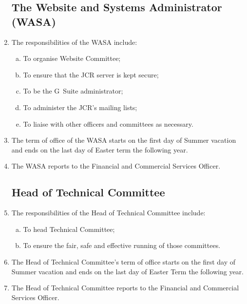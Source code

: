 \documentclass[12pt]{article}
\begin{document}
\begin{enumerate}
    \subsection{The Website and Systems Administrator (WASA)}
    \item The responsibilities of the WASA include:
    \begin{enumerate}[(a)]
        \item To organise Website Committee;
        \item To ensure that the JCR server is kept secure;
        \item To be the G~Suite administrator;
        \item To administer the JCR's mailing lists;
        \item To liaise with other officers and committees as necessary.
    \end{enumerate}
    \item The term of office of the WASA starts on the first day of Summer vacation and ends on the last day of Easter term the following year.
    \item The WASA reports to the Financial and Commercial Services Officer.

    \subsection{Head of Technical Committee}
    \item The responsibilities of the Head of Technical Committee include:
    \begin{enumerate}[(a)]
        \item To head Technical Committee;
        \item To ensure the fair, safe and effective running of those committees.
    \end{enumerate}
    \item The Head of Technical Committee's term of office starts on the first day of Summer vacation and ends on the last day of Easter Term the following year.
    \item The Head of Technical Committee reports to the Financial and Commercial Services Officer.


\end{enumerate}
\end{document}
